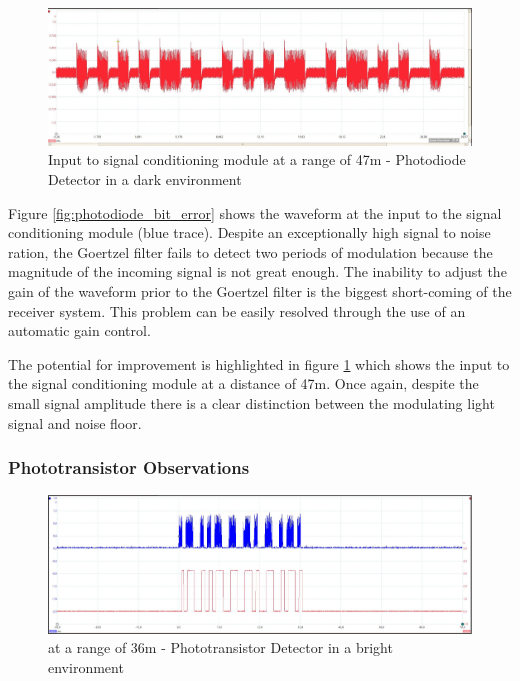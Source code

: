 \begin{figure}[H]
	\centering
	\includegraphics[width=.9\textwidth]{figures/results/drak_system_test/photodiode4770cm.jpg}
	\caption{Input to signal conditioning module at a range of 47m - Photodiode Detector in a dark environment}
	\label{fig:photodiode_range_4770cm}
\end{figure}

Figure \ref{fig:photodiode_bit_error} shows the waveform at the input to the signal conditioning module (blue trace). Despite an exceptionally high signal to noise ration, the Goertzel filter fails to detect two periods of modulation because the magnitude of the incoming signal is not great enough. The inability to adjust the gain of the waveform prior to the Goertzel filter is the biggest short-coming of the receiver system.  This problem can be easily resolved through the use of an automatic gain control.

The potential for improvement is highlighted in figure \ref{fig:photodiode_range_4770cm} which shows the input to the signal conditioning module at a distance of 47m. Once again, despite the small signal amplitude there is a clear distinction between the modulating light signal and noise floor.


\subsubsection{Phototransistor Observations}

\begin{figure}[H]
	\centering
	\includegraphics[width=.9\textwidth]{figures/results/system_test/36m_phototranaistoroutput.JPG}
	\caption{ at a range of 36m - Phototransistor Detector in a bright environment}
	\label{fig:phototransistor1}
\end{figure}


